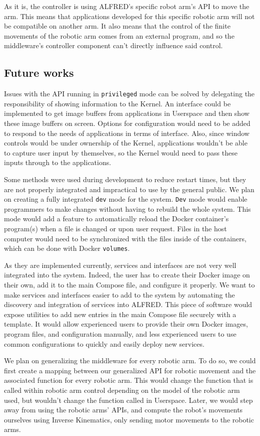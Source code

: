 As it is, the controller is using ALFRED's specific robot arm's API to move the arm.
This means that applications developed for this specific robotic arm will not be compatible on another arm.
It also means that the control of the finite movements of the robotic arm comes from an external program, and so the middleware's controller component can't directly influence said control.


\subsection{Future works}

Issues with the API running in \lstinline{privileged} mode can be solved by delegating the responsibility of showing information to the Kernel. An interface could be implemented to get image buffers from applications in Userspace and then show these image buffers on screen. Options for configuration would need to be added to respond to the needs of applications in terms of interface. Also, since window controls would be under ownership of the Kernel, applications wouldn't be able to capture user input by themselves, so the Kernel would need to pass these inputs through to the applications.

Some methods were used during development to reduce restart times, but they are not properly integrated and impractical to use by the general public. We plan on creating a fully integrated \lstinline{dev} mode for the system. \lstinline{Dev} mode would enable programmers to make changes without having to rebuild the whole system. This mode would add a feature to automatically reload the Docker container's program(s) when a file is changed or upon user request. Files in the host computer would need to be synchronized with the files inside of the containers, which can be done with Docker \lstinline{volumes}.

As they are implemented currently, services and interfaces are not very well integrated into the system. Indeed, the user has to create their Docker image on their own, add it to the main Compose file, and configure it properly. We want to make services and interfaces easier to add to the system by automating the discovery and integration of services into ALFRED. This piece of software would expose utilities to add new entries in the main Compose file securely with a template. It would allow experienced users to provide their own Docker images, program files, and configuration manually, and less experienced users to use common configurations to quickly and easily deploy new services.

We plan on generalizing the middleware for every robotic arm. To do so, we could first create a mapping between our generalized API for robotic movement and the associated function for every robotic arm. This would change the function that is called within robotic arm control depending on the model of the robotic arm used, but wouldn't change the function called in Userspace. Later, we would step away from using the robotic arms' APIs, and compute the robot's movements ourselves using Inverse Kinematics, only sending motor movements to the robotic arms.
